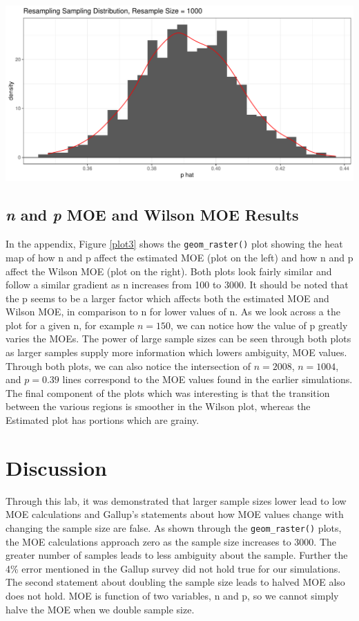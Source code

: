 \documentclass{article}\usepackage[]{graphicx}\usepackage[]{xcolor}
\newenvironment{Figure}
  {\par\medskip\noindent\minipage{\linewidth}}
  {\endminipage\par\medskip}
\begin{document}
\begin{multicols}{2}
\begin{center}
\begin{Figure}
\includegraphics[scale=0.35]{Rplot01.pdf}
\label{plot2}
\end{Figure}
\end{center}

\subsection{\textit{n} and \textit{p} MOE and Wilson MOE Results}
In the appendix, Figure \ref{plot3} shows the \verb|geom_raster()| plot showing the heat map of how n and p affect the estimated MOE (plot on the left) and how n and p affect the Wilson MOE (plot on the right). Both plots look fairly similar and follow a similar gradient as n increases from 100 to 3000. It should be noted that the p seems to be a larger factor which affects both the estimated MOE and Wilson MOE, in comparison to n for lower values of n. As we look across a the plot for a given n, for example $n = 150$, we can notice how the value of p greatly varies the MOEs. The power of large sample sizes can be seen through both plots as larger samples supply more information which lowers ambiguity, MOE values. Through both plots, we can also notice the intersection of $n = 2008$, $n = 1004$, and $p = 0.39$ lines correspond to the MOE values found in the earlier simulations. The final component of the plots which was interesting is that the transition between the various regions is smoother in the Wilson plot, whereas the Estimated plot has portions which are grainy.


\section{Discussion}
Through this lab, it was demonstrated that larger sample sizes lower lead to low MOE calculations and Gallup's statements about how MOE values change with changing the sample size are false. As shown through the \verb|geom_raster()| plots, the MOE calculations approach zero as the sample size increases to 3000. The greater number of samples leads to less ambiguity about the sample. Further the 4\% error mentioned in the Gallup survey did not hold true for our simulations. The second statement about doubling the sample size leads to halved MOE also does not hold. MOE is function of two variables, n and p, so we cannot simply halve the MOE when we double sample size.


\end{multicols}
\end{document}

